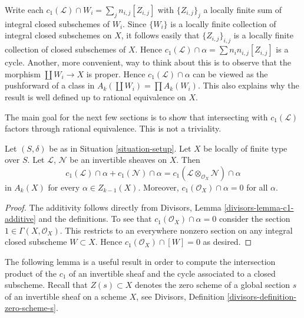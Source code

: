 \noindent
Write each $c_1(\mathcal{L}) \cap W_i = \sum_j n_{i, j} [Z_{i, j}]$
with $\{Z_{i, j}\}_j$ a locally finite sum
of integral closed subschemes of $W_i$. Since $\{W_i\}$ is a locally
finite collection of integral closed subschemes on $X$, it follows
easily that $\{Z_{i, j}\}_{i, j}$ is a locally finite collection
of closed subschemes of $X$. Hence
$c_1(\mathcal{L}) \cap \alpha = \sum n_in_{i, j}[Z_{i, j}]$
is a cycle. Another, more convenient, way to think about this
is to observe that the morphism $\coprod W_i \to X$ is
proper. Hence $c_1(\mathcal{L}) \cap \alpha$ can be viewed
as the pushforward of a class in $A_k(\coprod W_i) = \prod A_k(W_i)$.
This also explains why the result is well defined up to rational
equivalence on $X$.

\medskip\noindent
The main goal for the next few sections is to show that intersecting with
$c_1(\mathcal{L})$ factors through rational equivalence.
This is not a triviality.

\begin{lemma}
\label{lemma-c1-cap-additive}
Let $(S, \delta)$ be as in Situation \ref{situation-setup}.
Let $X$ be locally of finite type over $S$.
Let $\mathcal{L}$, $\mathcal{N}$ be an invertible sheaves on $X$.
Then
$$
c_1(\mathcal{L}) \cap \alpha  + c_1(\mathcal{N}) \cap \alpha =
c_1(\mathcal{L} \otimes_{\mathcal{O}_X} \mathcal{N}) \cap \alpha
$$
in $A_k(X)$ for every $\alpha \in Z_{k - 1}(X)$. Moreover,
$c_1(\mathcal{O}_X) \cap \alpha = 0$ for all $\alpha$.
\end{lemma}

\begin{proof}
The additivity follows directly from
Divisors, Lemma \ref{divisors-lemma-c1-additive}
and the definitions. To see that $c_1(\mathcal{O}_X) \cap \alpha = 0$
consider the section $1 \in \Gamma(X, \mathcal{O}_X)$. This restricts
to an everywhere nonzero section on any integral closed subscheme
$W \subset X$. Hence $c_1(\mathcal{O}_X) \cap [W] = 0$ as desired.
\end{proof}

\noindent
The following lemma is a useful result in order to compute the intersection
product of the $c_1$ of an invertible sheaf and the cycle associated
to a closed subscheme.
Recall that $Z(s) \subset X$ denotes the zero scheme of a global section
$s$ of an invertible sheaf on a scheme $X$, see
Divisors, Definition \ref{divisors-definition-zero-scheme-s}.

